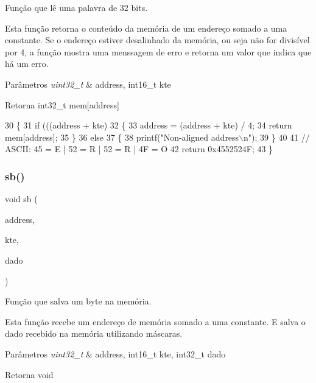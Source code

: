 Função que lê uma palavra de 32 bits. 

Esta função retorna o conteúdo da memória de um endereço somado a uma constante. Se o endereço estiver desalinhado da memória, ou seja não for divisível por 4, a função mostra uma menssagem de erro e retorna um valor que indica que há um erro. 
\begin{DoxyParams}{Parâmetros}
{\em uint32\+\_\+t} & address, int16\+\_\+t kte \\
\hline
\end{DoxyParams}
\begin{DoxyReturn}{Retorna}
int32\+\_\+t mem[address] 
\end{DoxyReturn}

\begin{DoxyCode}
30 \{
31     \textcolor{keywordflow}{if} (((address + kte) %
32     \{
33         address = (address + kte) / 4;
34         \textcolor{keywordflow}{return} mem[address];
35     \}
36     \textcolor{keywordflow}{else}
37     \{
38         printf(\textcolor{stringliteral}{"Non-aligned address\(\backslash\)n"});
39     \}
40 
41     \textcolor{comment}{// ASCII: 45 = E | 52 = R | 52 = R | 4F = O}
42     \textcolor{keywordflow}{return} 0x4552524F;
43 \}
\end{DoxyCode}
\mbox{\label{memory_8h_a1e98f7a2e8e450eebfb2f6b6be93ab2d}} 
\subsubsection{sb()}
{\footnotesize\ttfamily void sb (\begin{DoxyParamCaption}\item[{uint32\+\_\+t}]{address,  }\item[{int16\+\_\+t}]{kte,  }\item[{int8\+\_\+t}]{dado }\end{DoxyParamCaption})}



Função que salva um byte na memória. 

Esta função recebe um endereço de memória somado a uma constante. E salva o dado recebido na memória utilizando máscaras. 
\begin{DoxyParams}{Parâmetros}
{\em uint32\+\_\+t} & address, int16\+\_\+t kte, int32\+\_\+t dado \\
\hline
\end{DoxyParams}
\begin{DoxyReturn}{Retorna}
void 
\end{DoxyReturn}


